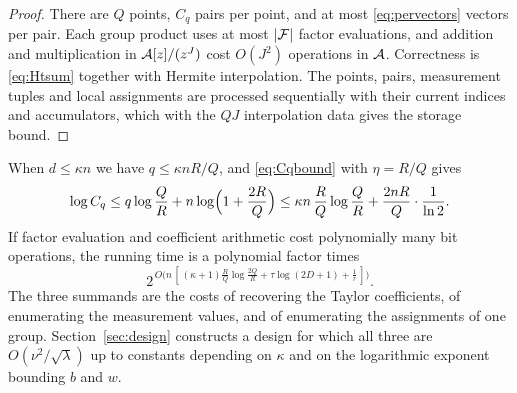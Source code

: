 \begin{proof}
There are $Q$ points, $C_q$ pairs per point, and at most \eqref{eq:pervectors}
vectors per pair. Each group product uses at most $|\mathcal{F}|$ factor evaluations, and
addition and multiplication in $\mathcal{A}[z]/(z^J)$ cost $O(J^2)$ operations in $\mathcal{A}$.
Correctness is \eqref{eq:Htsum} together with Hermite interpolation. The points,
pairs, measurement tuples and local assignments are processed sequentially with
their current indices and accumulators, which with the $QJ$ interpolation data
gives the storage bound.
\end{proof}

When $d\le\kappa n$ we have $q\le\kappa nR/Q$, and \eqref{eq:Cqbound} with
$\eta=R/Q$ gives
\begin{equation}\label{eq:logCq}
  \log C_q\le q\log\frac QR+n\log\Bigl(1+\frac{2R}{Q}\Bigr)
  \le \kappa n\,\frac RQ\log\frac QR+\frac{2nR}{Q}\cdot\frac{1}{\ln2}.
\end{equation}
If factor evaluation and coefficient arithmetic cost polynomially many bit
operations, the running time is a polynomial factor times
\begin{equation}\label{eq:threecosts}
  2^{\,O\bigl(n\,[\,(\kappa+1)\frac RQ\log\frac{2Q}{R}+\tau\log(2D+1)+\frac1r\,]\bigr)} .
\end{equation}
The three summands are the costs of recovering the Taylor coefficients, of
enumerating the measurement values, and of enumerating the assignments of one
group. Section~\ref{sec:design} constructs a design for which all three are
$O(\nu^2/\sqrt\lambda)$ up to constants depending on $\kappa$ and on the
logarithmic exponent bounding $b$ and $w$.
